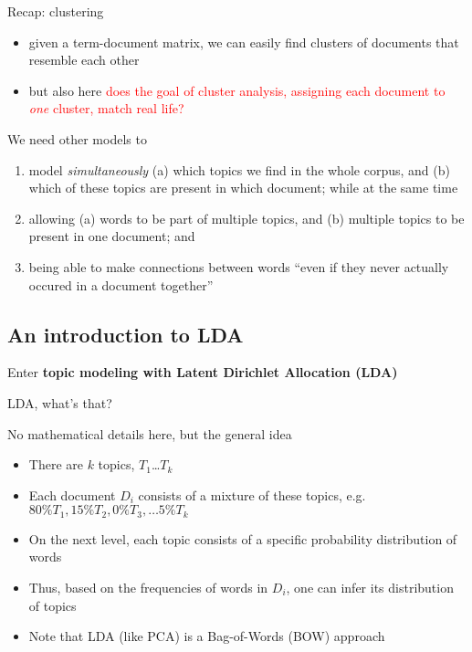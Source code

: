 \begin{frame}{Recap: clustering}
\begin{itemize}
	\item given a term-document matrix, we can easily find clusters of documents that resemble each other
	\item but also here \textcolor{red}{does the goal of cluster analysis, assigning each document to \emph{one} cluster, match real life?}
\end{itemize}
\end{frame}


\begin{frame}{We need other models to}
\begin{enumerate}[<+->]
	\item model \emph{simultaneously} (a) which topics we find in the whole corpus, and (b) which of these topics are present in which document; while at the same time
	\item allowing (a) words to be part of multiple topics, and (b) multiple topics to be present in one document; and
	\item being able to make connections between words ``even if they never actually occured in a document together'' \parencite[p.~96]{Maier2018a}
\end{enumerate}

\end{frame}




\subsection{An introduction to LDA}

\begin{frame}{}
	Enter \textbf{topic modeling with Latent Dirichlet Allocation (LDA)}
\end{frame}






\begin{frame}{LDA, what's that?}
  \begin{block}{No mathematical details here, but the general idea}
    \begin{itemize}
    \item There are $k$ topics, $T_1$\ldots$T_k$
    \item Each document $D_i$ consists of a mixture of these topics, e.g.$80\% T_1, 15\% T_2, 0\% T_3, \ldots 5\% T_k $
    \item On the next level, each topic consists of a specific probability distribution of words
    \item Thus, based on the frequencies of words in $D_i$, one can infer its distribution of topics
    \item Note that LDA (like PCA) is a Bag-of-Words (BOW) approach
    \end{itemize}
  \end{block}
	
\end{frame}




